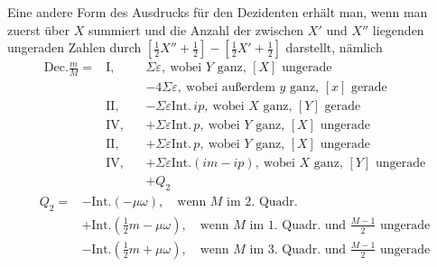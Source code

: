 Eine andere Form des Ausdrucks für den Dezidenten erhält man, wenn man zuerst über $X$ summiert und die Anzahl der zwischen $X'$ und $X''$ liegenden ungeraden Zahlen durch $[\tfrac12X''+\tfrac12]-[\tfrac12X'+\tfrac12]$ darstellt, nämlich
\[
\begin{aligned}
\mathrm{Dec.}\frac mM={}&\mathrm{I},& &\Sigma\varepsilon,\ \text{wobei }Y\text{ ganz, }[X]\text{ ungerade}\\
&&&-4\Sigma\varepsilon,\ \text{wobei außerdem }y\text{ ganz, }[x]\text{ gerade}\\
&\mathrm{II},&&-\Sigma\varepsilon\mathrm{Int.}\,ip,\ \text{wobei }X\text{ ganz, }[Y]\text{ gerade}\\
&\mathrm{IV},&&+\Sigma\varepsilon\mathrm{Int.}\,p,\ \text{wobei }Y\text{ ganz, }[X]\text{ ungerade}\\
&\mathrm{II},&&+\Sigma\varepsilon\mathrm{Int.}\,p,\ \text{wobei }Y\text{ ganz, }[X]\text{ ungerade}\\
&\mathrm{IV},&&+\Sigma\varepsilon\mathrm{Int.}(im-ip),\ \text{wobei }X\text{ ganz, }[Y]\text{ ungerade}\\
&&&+Q_2
\end{aligned}
\]
\[
\begin{aligned}
Q_2={}&-\mathrm{Int.}(-\mu\omega),\quad\text{wenn }M\text{ im }2.\text{ Quadr.}\\
&+\mathrm{Int.}(\tfrac12m-\mu\omega),\quad\text{wenn }M\text{ im }1.\text{ Quadr. und }\frac{M-1}{2}\text{ ungerade}\\
&-\mathrm{Int.}(\tfrac12m+\mu\omega),\quad\text{wenn }M\text{ im }3.\text{ Quadr. und }\frac{M-1}{2}\text{ ungerade}
\end{aligned}
\]

